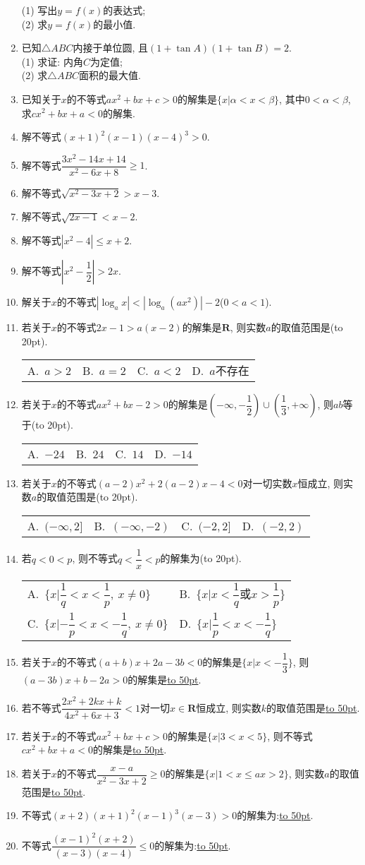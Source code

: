 \documentclass[10pt,a4paper]{article}
\newcommand{\blank}[1]{\underline{\hbox to #1pt{}}}
\newcommand{\bracket}[1]{(\hbox to #1pt{})}
\newcommand{\twoch}[4]{\par\begin{tabular}{p{.46\textwidth}p{.46\textwidth}}
A.~#1& B.~#2\\
C.~#3& D.~#4
\end{tabular}}
\newcommand{\fourch}[4]{\par\begin{tabular}{p{.23\textwidth}p{.23\textwidth}p{.23\textwidth}p{.23\textwidth}}
A.~#1 &B.~#2& C.~#3& D.~#4
\end{tabular}}
\begin{document}
\begin{enumerate}[1.]
(1) 写出$y=f(x)$的表达式;\\
(2) 求$y=f(x)$的最小值.
\item 已知$\triangle ABC$内接于单位圆, 且$(1+\tan A)(1+\tan B)=2$.\\
(1) 求证: 内角$C$为定值;\\
(2) 求$\triangle ABC$面积的最大值.
\item 已知关于$x$的不等式$ax^2+bx+c>0$的解集是$\{x|\alpha<x<\beta\}$, 其中$0<\alpha<\beta$, 求$cx^2+bx+a<0$的解集.
\item 解不等式$(x+1)^2(x-1)(x-4)^3>0$.
\item 解不等式$\dfrac{3x^2-14x+14}{x^2-6x+8}\ge 1$.
\item 解不等式$\sqrt{x^2-3x+2}>x-3$.
\item 解不等式$\sqrt{2x-1}<x-2$.
\item 解不等式$|x^2-4|\le x+2$.
\item 解不等式$|x^2-\dfrac 12|>2x$.
\item 解关于$x$的不等式$|\log_ax|<|\log_a(ax^2)|-2$($0<a<1$).
\item 若关于$x$的不等式$2x-1>a(x-2)$的解集是$\mathbf{R}$, 则实数$a$的取值范围是\bracket{20}.
\fourch{$a>2$}{$a=2$}{$a<2$}{$a$不存在}
\item 若关于$x$的不等式$ax^2+bx-2>0$的解集是$(-\infty ,-\dfrac 12)\cup (\dfrac 13,+\infty)$, 则$ab$等于\bracket{20}.
\fourch{$-24$}{$24$}{$14$}{$-14$}
\item 若关于$x$的不等式$(a-2)x^2+2(a-2)x-4<0$对一切实数$x$恒成立, 则实数$a$的取值范围是\bracket{20}.
\fourch{$(-\infty ,2]$}{$(-\infty,-2)$}{$(-2,2]$}{$(-2,2)$}
\item 若$q<0<p$, 则不等式$q<\dfrac 1x<p$的解集为\bracket{20}.
\twoch{$\{x|\dfrac 1q<x<\dfrac 1p,\  x\ne 0\}$}{$\{x|x<\dfrac 1q\text{或}x>\dfrac 1p\}$}{$\{x|-\dfrac 1p<x<-\dfrac 1q, \ x\ne 0\}$}{$\{x|\dfrac 1p<x<-\dfrac 1q\}$}
\item 若关于$x$的不等式$(a+b)x+2a-3b<0$的解集是$\{x|x<-\dfrac 13\}$, 则$(a-3b)x+b-2a>0$的解集是\blank{50}.
\item 若不等式$\dfrac{2x^2+2kx+k}{4x^2+6x+3}<1$对一切$x\in \mathbf{R}$恒成立, 则实数$k$的取值范围是\blank{50}.
\item 若关于$x$的不等式$ax^2+bx+c>0$的解集是$\{x|3<x<5\}$, 则不等式$cx^2+bx+a<0$的解集是\blank{50}.
\item 若关于$x$的不等式$\dfrac{x-a}{x^2-3x+2}\ge 0$的解集是$\{x|1<x\le ax>2\}$, 则实数$a$的取值范围是\blank{50}.
\item 不等式$(x+2)(x+1)^2(x-1)^3(x-3)>0$的解集为:\blank{50}.
\item 不等式$\dfrac{(x-1)^2(x+2)}{(x-3)(x-4)}\le 0$的解集为:\blank{50}.

\end{enumerate}
\end{document}

